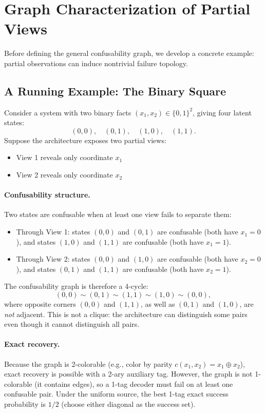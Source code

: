 \section{Graph Characterization of Partial Views}\label{sec:graph-characterization}


Before defining the general confusability graph, we develop a concrete example: partial observations can induce nontrivial failure topology.

\subsection{A Running Example: The Binary Square}\label{sec:binary-square}

Consider a system with two binary facts $(x_1, x_2) \in \{0,1\}^2$, giving four latent states:
\[
(0,0), \quad (0,1), \quad (1,0), \quad (1,1).
\]
Suppose the architecture exposes two partial views:
\begin{itemize}
\item View 1 reveals only coordinate $x_1$
\item View 2 reveals only coordinate $x_2$
\end{itemize}

\paragraph{Confusability structure.}
Two states are confusable when at least one view fails to separate them:
\begin{itemize}
\item Through View 1: states $(0,0)$ and $(0,1)$ are confusable (both have $x_1=0$), and states $(1,0)$ and $(1,1)$ are confusable (both have $x_1=1$).
\item Through View 2: states $(0,0)$ and $(1,0)$ are confusable (both have $x_2=0$), and states $(0,1)$ and $(1,1)$ are confusable (both have $x_2=1$).
\end{itemize}
The confusability graph is therefore a 4-cycle:
\[
(0,0) \sim (0,1) \sim (1,1) \sim (1,0) \sim (0,0),
\]
where opposite corners $(0,0)$ and $(1,1)$, as well as $(0,1)$ and $(1,0)$, are \emph{not} adjacent. This is not a clique: the architecture can distinguish some pairs even though it cannot distinguish all pairs.

\paragraph{Exact recovery.}
Because the graph is 2-colorable (e.g., color by parity $c(x_1,x_2) = x_1 \oplus x_2$), exact recovery is possible with a 2-ary auxiliary tag. However, the graph is not 1-colorable (it contains edges), so a 1-tag decoder must fail on at least one confusable pair. Under the uniform source, the best 1-tag exact success probability is $1/2$ (choose either diagonal as the success set).


